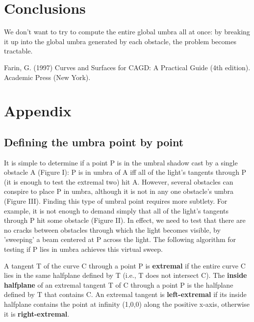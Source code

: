 \documentclass[12pt]{article}
\begin{document}

\section{Conclusions}

We don't want to try to compute the entire global umbra all at once:
by breaking it up into the global umbra generated by each obstacle,
the problem becomes tractable.



% 
\begin{thebibliography}{99}

Farin, G. (1997)
Curves and Surfaces for CAGD: A Practical Guide (4th edition).
Academic Press (New York).

\end{thebibliography}

\section{Appendix}
\label{sec:appendix}

\subsection{Defining the umbra point by point}
\label{sec:local}

It is simple to determine if a point P is in the umbral shadow cast by a 
single obstacle A (Figure I):
P is in umbra of A iff all of the light's tangents through P (it is enough to test
the extremal two) hit A.
However, several obstacles can conspire to place P in umbra, although it is not
in any one obstacle's umbra (Figure III).
Finding this type of umbral point requires more subtlety.
For example, it is not enough to demand simply that all of the light's tangents through P
hit some obstacle (Figure II).
In effect, we need to test that there are no cracks between obstacles through which
the light becomes visible, by 'sweeping' a beam centered at P across the light.
The following algorithm for testing if P lies in umbra achieves this virtual sweep.

\begin{defn2}
A tangent T of the curve C through a point P is {\bf extremal}
if the entire curve C lies in the same halfplane defined by T
(i.e., T does not intersect C).
The {\bf inside halfplane} of an extremal tangent T of C through a point P is
the halfplane defined by T that contains C.
An extremal tangent is {\bf left-extremal} if its inside halfplane 
contains the point at infinity (1,0,0) along the positive x-axis,
otherwise it is {\bf right-extremal}.
\end{defn2}
\end{document}
